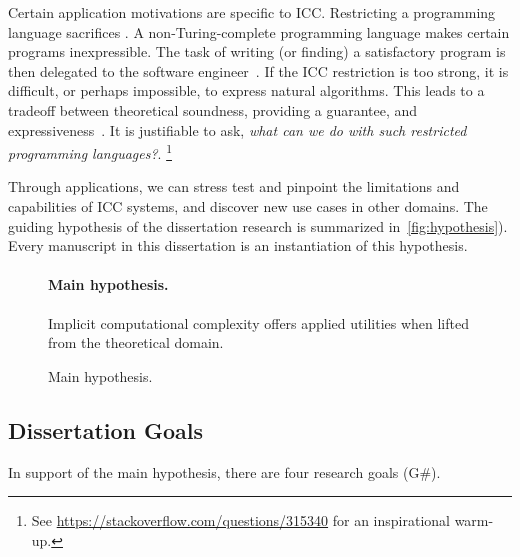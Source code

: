 Certain application motivations are specific to ICC\@.
Restricting a programming language sacrifices .
A non-Turing-complete programming language makes certain programs inexpressible.
The task of writing (or finding) a satisfactory program is then delegated to the software engineer~\cite[p. 14]{moyen2017}.
If the ICC restriction is too strong, it is difficult, or perhaps impossible, to express natural algorithms.
This leads to a tradeoff between theoretical soundness, \ie providing a guarantee, and expressiveness~\cite{feree2018}.
It is justifiable to ask, \emph{what can we do with such restricted programming languages?}.%
\footnote{See \url{https://stackoverflow.com/questions/315340} for an inspirational warm-up.}

Through applications, we can stress test and pinpoint the limitations and capabilities of ICC systems, and discover new use cases in other domains.
The guiding hypothesis of the dissertation research is summarized in~\autoref{fig:hypothesis}). Every manuscript in this dissertation is an instantiation of this hypothesis.

\begin{figure}[h]
\begin{mdframed}
\paragraph*{Main hypothesis.}
Implicit computational complexity offers applied utilities when lifted from the
theoretical domain.
\end{mdframed}
\caption[Main hypothesis summarized]{Main hypothesis.}
\label{fig:hypothesis}
\end{figure}

\subsection{Dissertation Goals}\label{subsec:specific-aims}

In support of the main hypothesis, there are four research goals (G\#).

